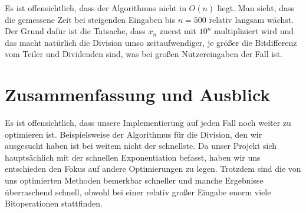 \documentclass[course=erap]{aspdoc}
\begin{document}
Es ist offensichtlich, dass der Algorithmus nicht in $O(n)$ liegt. Man sieht, dass die gemessene Zeit bei steigenden Eingaben bis $n = 500$ relativ langsam wächst. Der Grund dafür ist die Tatsache, dass $x_n$ zuerst mit $10^n$ multipliziert wird und das macht natürlich die Division umso zeitaufwendiger, je größer die Bitdifferenz vom Teiler und Dividenden sind, was bei großen Nutzereingaben der Fall ist. 

\section{Zusammenfassung und Ausblick}
Es ist offensichtlich, dass unsere Implementierung auf jeden Fall noch weiter zu optimieren ist. Beispielsweise der Algorithmus für die Division, den wir ausgesucht haben ist bei weitem nicht der schnellste. Da unser Projekt sich hauptsächlich mit der schnellen Exponentiation befasst, haben wir uns entschieden den Fokus auf andere Optimierungen zu legen. Trotzdem sind die von uns optimierten Methoden bemerkbar schneller und manche Ergebnisse überraschend schnell, obwohl bei einer relativ großer Eingabe enorm viele Bitoperationen stattfinden.


{}
\end{document}
